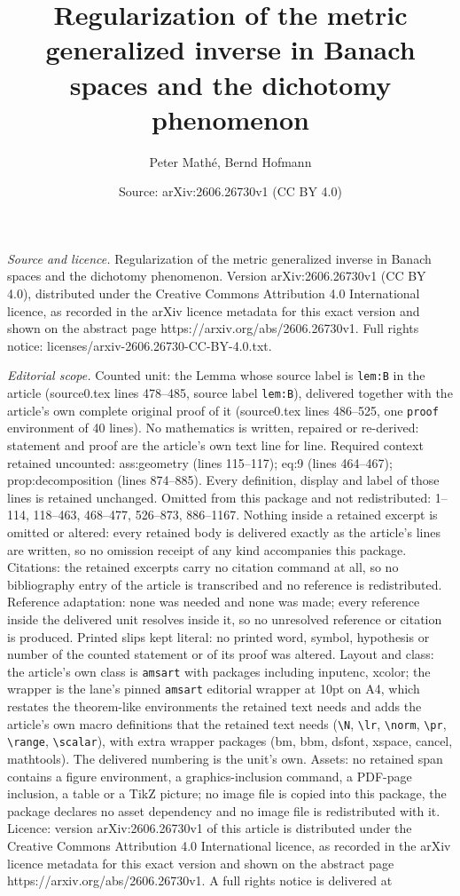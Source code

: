 \documentclass[10pt,a4paper]{amsart}
\title[Regularization of the metric generalized inverse in Banach s]{Regularization of the metric generalized inverse in Banach spaces and the dichotomy phenomenon}
\author{Peter Math\'e, Bernd Hofmann}
\date{Source: arXiv:2606.26730v1 (CC BY 4.0)}
\begin{document}
\maketitle

\noindent\emph{Source and licence.} Regularization of the metric generalized inverse in Banach spaces and the dichotomy phenomenon. Version arXiv:2606.26730v1 (CC BY 4.0), distributed under the Creative Commons Attribution 4.0 International licence, as recorded in the arXiv licence metadata for this exact version and shown on the abstract page https://arxiv.org/abs/2606.26730v1. Full rights notice: licenses/arxiv-2606.26730-CC-BY-4.0.txt.\par\smallskip

\noindent\textit{Editorial scope.} Counted unit: the Lemma whose source label is \texttt{lem:B} in the article (source0.tex lines 478--485, source label \texttt{lem:B}), delivered together with the article's own complete original proof of it (source0.tex lines 486--525, one \texttt{proof} environment of 40 lines). No mathematics is written, repaired or re-derived: statement and proof are the article's own text line for line. Required context retained uncounted: ass:geometry (lines 115--117); eq:9 (lines 464--467); prop:decomposition (lines 874--885). Every definition, display and label of those lines is retained unchanged. Omitted from this package and not redistributed: 1--114, 118--463, 468--477, 526--873, 886--1167. Nothing inside a retained excerpt is omitted or altered: every retained body is delivered exactly as the article's lines are written, so no omission receipt of any kind accompanies this package. Citations: the retained excerpts carry no citation command at all, so no bibliography entry of the article is transcribed and no reference is redistributed. Reference adaptation: none was needed and none was made; every reference inside the delivered unit resolves inside it, so no unresolved reference or citation is produced. Printed slips kept literal: no printed word, symbol, hypothesis or number of the counted statement or of its proof was altered. Layout and class: the article's own class is \texttt{amsart} with packages including inputenc, xcolor; the wrapper is the lane's pinned \texttt{amsart} editorial wrapper at 10pt on A4, which restates the theorem-like environments the retained text needs and adds the article's own macro definitions that the retained text needs (\texttt{\textbackslash N}, \texttt{\textbackslash lr}, \texttt{\textbackslash norm}, \texttt{\textbackslash pr}, \texttt{\textbackslash range}, \texttt{\textbackslash scalar}), with extra wrapper packages (bm, bbm, dsfont, xspace, cancel, mathtools). The delivered numbering is the unit's own. Assets: no retained span contains a figure environment, a graphics-inclusion command, a PDF-page inclusion, a table or a TikZ picture; no image file is copied into this package, the package declares no asset dependency and no image file is redistributed with it. Licence: version arXiv:2606.26730v1 of this article is distributed under the Creative Commons Attribution 4.0 International licence, as recorded in the arXiv licence metadata for this exact version and shown on the abstract page https://arxiv.org/abs/2606.26730v1. A full rights notice is delivered at 
\end{document}
